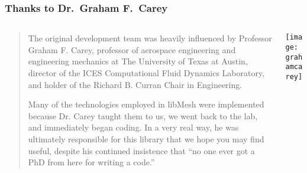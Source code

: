%

\frame
{
  \frametitle{Thanks to Dr.\ Graham F.\ Carey}

  \begin{columns}
    \begin{column}{.55\textwidth}
      \scriptsize
      \begin{quote}
        The original development team was heavily influenced by Professor Graham F. Carey, professor of aerospace engineering and engineering mechanics at The University of Texas at Austin, director of the ICES Computational Fluid Dynamics Laboratory, and holder of the Richard B. Curran Chair in Engineering.

        Many of the technologies employed in libMesh were implemented because Dr. Carey taught them to us, we went back to the lab, and immediately began coding. In a very real way, he was ultimately responsible for this library that we hope you may find useful, despite his continued insistence that ``no one ever got a PhD from here for writing a code.''
      \end{quote}
\normalsize
    \end{column}
    \begin{column}{.45\textwidth}
      \texttt{[image: grahamcarey]}
    \end{column}
  \end{columns}
}


